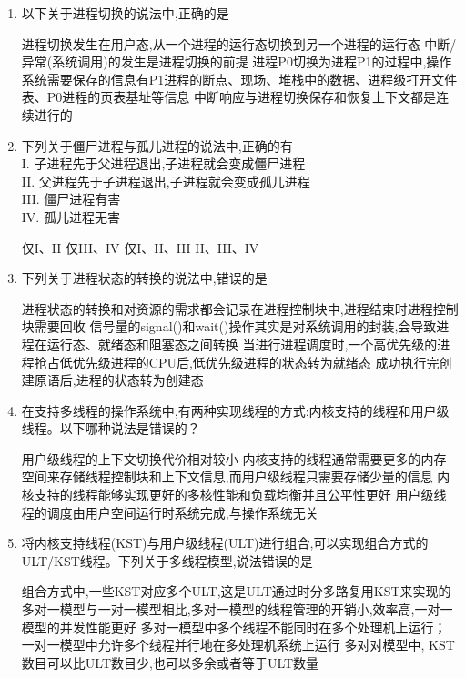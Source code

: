 \documentclass[12pt, a4paper, oneside, UTF8]{ctexbook}
\begin{document}
\begin{enumerate}
    \item 以下关于进程切换的说法中,正确的是
    \begin{choices}[1]
    \task 进程切换发生在用户态,从一个进程的运行态切换到另一个进程的运行态
    \task 中断/异常(系统调用)的发生是进程切换的前提
    \task 进程P0切换为进程P1的过程中,操作系统需要保存的信息有P1进程的断点、现场、堆栈中的数据、进程级打开文件表、P0进程的页表基址等信息
    \task 中断响应与进程切换保存和恢复上下文都是连续进行的
    \end{choices}


    \item 下列关于僵尸进程与孤儿进程的说法中,正确的有\\
    I. 子进程先于父进程退出,子进程就会变成僵尸进程\\
    II. 父进程先于子进程退出,子进程就会变成孤儿进程\\
    III. 僵尸进程有害\\
    IV. 孤儿进程无害
    \begin{choices}[2]
    \task 仅I、II
    \task 仅III、IV
    \task 仅I、II、III
    \task II、III、IV
    \end{choices}

    \item 下列关于进程状态的转换的说法中,错误的是
    \begin{choices}[1]
    \task 进程状态的转换和对资源的需求都会记录在进程控制块中,进程结束时进程控制块需要回收
    \task 信号量的signal()和wait()操作其实是对系统调用的封装,会导致进程在运行态、就绪态和阻塞态之间转换
    \task 当进行进程调度时,一个高优先级的进程抢占低优先级进程的CPU后,低优先级进程的状态转为就绪态
    \task 成功执行完创建原语后,进程的状态转为创建态
    \end{choices}

    \item 在支持多线程的操作系统中,有两种实现线程的方式:内核支持的线程和用户级线程。以下哪种说法是错误的？
    \begin{choices}[1]
    \task 用户级线程的上下文切换代价相对较小
    \task 内核支持的线程通常需要更多的内存空间来存储线程控制块和上下文信息,而用户级线程只需要存储少量的信息
    \task 内核支持的线程能够实现更好的多核性能和负载均衡并且公平性更好
    \task 用户级线程的调度由用户空间运行时系统完成,与操作系统无关
    \end{choices}


    \item 将内核支持线程(KST)与用户级线程(ULT)进行组合,可以实现组合方式的ULT/KST线程。下列关于多线程模型,说法错误的是
    \begin{choices}[1]
    \task 组合方式中,一些KST对应多个ULT,这是ULT通过时分多路复用KST来实现的
    \task 多对一模型与一对一模型相比,多对一模型的线程管理的开销小,效率高,一对一模型的并发性能更好
    \task 多对一模型中多个线程不能同时在多个处理机上运行；一对一模型中允许多个线程并行地在多处理机系统上运行
    \task 多对对模型中, KST数目可以比ULT数目少,也可以多余或者等于ULT数量
    \end{choices}



\end{enumerate}
\end{document}
